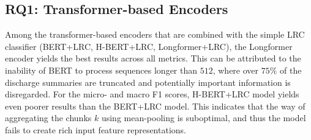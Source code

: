 \documentclass[11pt]{article}
\begin{document}
\subsection{RQ1: Transformer-based Encoders}
Among the transformer-based encoders that are combined with the simple LRC classifier (BERT+LRC, H-BERT+LRC, Longformer+LRC), the Longformer encoder yields the best results across all metrics. 
This can be attributed to the inability of BERT to process sequences longer than $512$, where over $75\%$ of the discharge summaries are truncated and potentially important information is disregarded.
For the micro- and macro F1 scores, H-BERT+LRC model yields even poorer results than the BERT+LRC model. This indicates that the way of aggregating the chunks $k$ using mean-pooling is suboptimal, and thus the model fails to create rich input feature representations. %
\end{document}
